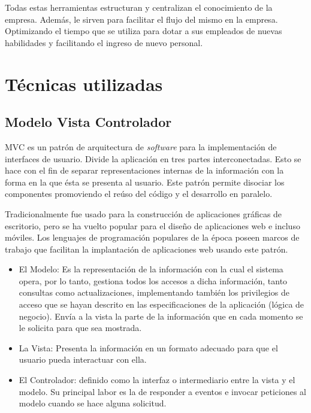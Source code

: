 Todas estas herramientas estructuran y centralizan el conocimiento de la empresa. Además, le sirven para facilitar el flujo del mismo en la empresa. Optimizando el tiempo que se utiliza para dotar a sus empleados de nuevas habilidades y facilitando el ingreso de nuevo personal.

\section{Técnicas utilizadas}

\subsection{Modelo Vista Controlador}

\gls{MVC} es un patrón de arquitectura de \emph{software} para la implementación de interfaces de usuario. Divide la aplicación en tres partes interconectadas. Esto se hace con el fin de separar representaciones internas de la información con la forma en la que ésta se presenta al usuario. Este patrón permite disociar los componentes promoviendo el reúso del código y el desarrollo en paralelo\cite{bib:mvc}.

Tradicionalmente fue usado para la construcción de aplicaciones gráficas de escritorio, pero se ha vuelto popular para el diseño de aplicaciones web e incluso móviles. Los lenguajes de programación populares de la época poseen marcos de trabajo que facilitan la implantación de aplicaciones web usando este patrón.

\begin{itemize}

\item El Modelo: Es la representación de la información con la cual el sistema opera, por lo tanto, gestiona todos los accesos a dicha información, tanto consultas como actualizaciones, implementando también los privilegios de acceso que se hayan descrito en las especificaciones de la aplicación (lógica de negocio). Envía a la vista la parte de la información que en cada momento se le solicita para que sea mostrada.

\item La Vista: Presenta la información en un formato adecuado para que el usuario pueda interactuar con ella.

\item El Controlador: definido como la interfaz o intermediario entre la vista y el modelo. Su principal labor es la de responder a eventos e invocar peticiones al modelo cuando se hace alguna solicitud. 

\end{itemize}

